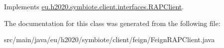 Implements \hyperlink{interfaceeu_1_1h2020_1_1symbiote_1_1client_1_1interfaces_1_1RAPClient_a256f8b1fb0359bf813d5ca4bd62596a1}{eu.\+h2020.\+symbiote.\+client.\+interfaces.\+R\+A\+P\+Client}.



The documentation for this class was generated from the following file\+:\begin{DoxyCompactItemize}
\item 
src/main/java/eu/h2020/symbiote/client/feign/Feign\+R\+A\+P\+Client.\+java\end{DoxyCompactItemize}
